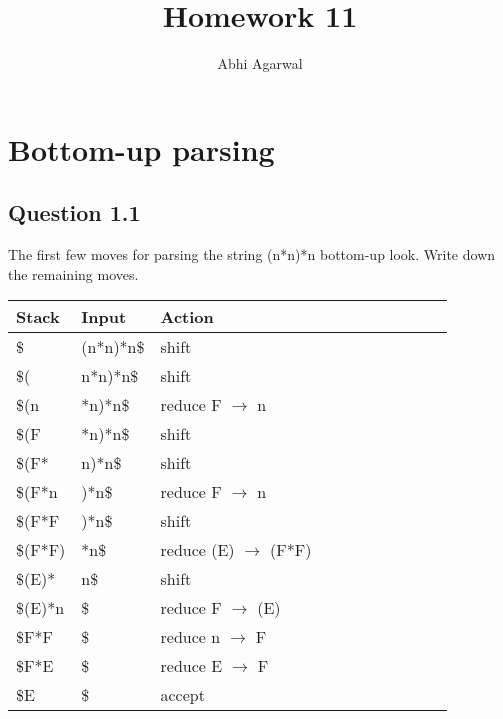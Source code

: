 \documentclass[11pt, oneside]{article}   	%
\title{Homework 11}
\author{Abhi Agarwal}
\date{}
\begin{document}
\maketitle

\section{Bottom-up parsing}

\subsection*{Question 1.1} 
\par The first few moves for parsing the string (n*n)*n bottom-up look. Write down the remaining moves.
\begin{center}
    \begin{tabular}{| l | l | l | l | l | l | l | l | l | l | l |}
    \hline
    Stack & Input & Action \\ \hline
    \$ & (n*n)*n\$ & shift \\ \hline
    \$( & n*n)*n\$ & shift \\ \hline
    \$(n & *n)*n\$ & reduce F $\rightarrow$ n \\ \hline
    \$(F & *n)*n\$ & shift \\ \hline
    \$(F* & n)*n\$ & shift \\ \hline
    \$(F*n & )*n\$ & reduce F $\rightarrow$ n \\ \hline
    \$(F*F & )*n\$ & shift \\ \hline
    \$(F*F) & *n\$ & reduce (E) $\rightarrow$ (F*F) \\ \hline
    \$(E)* & n\$ & shift \\ \hline
    \$(E)*n & \$ & reduce F $\rightarrow$ (E) \\ \hline
    \$F*F & \$ & reduce n $\rightarrow$ F \\ \hline
    \$F*E & \$ & reduce E $\rightarrow$ F \\ \hline
    \$E & \$ & accept \\ \hline
    \end{tabular}
\end{center}
\end{document}
